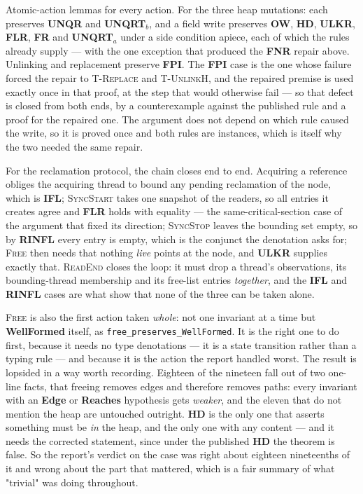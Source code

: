 Atomic-action lemmas for every action.  For the three heap mutations: each
preserves \textbf{UNQR} and \textbf{UNQRT}$_b$, and a field write preserves
\textbf{OW}, \textbf{HD}, \textbf{ULKR}, \textbf{FLR}, \textbf{FR} and
\textbf{UNQRT}$_a$ under a side condition apiece, each of which the rules
already supply --- with the one exception that produced the \textbf{FNR} repair
above.  Unlinking and replacement preserve \textbf{FPI}.  The \textbf{FPI} case
is the one whose failure forced the repair to \textsc{T-Replace} and
\textsc{T-UnlinkH}, and the
repaired premise is used exactly once in that proof, at the step that would otherwise
fail --- so that defect is closed from both ends, by a counterexample against the
published rule and a proof for the repaired one.  The argument does not depend on
which rule caused the write, so it is proved once and both rules are instances,
which is itself why the two needed the same repair.

For the reclamation protocol, the chain closes end to end.  Acquiring a
reference obliges the acquiring thread to bound any pending reclamation of the
node, which is \textbf{IFL}; \textsc{SyncStart} takes one snapshot of the
readers, so all entries it creates agree and \textbf{FLR} holds with equality
--- the same-critical-section case of the argument that fixed its direction;
\textsc{SyncStop} leaves the bounding set empty, so by \textbf{RINFL} every
entry is empty, which is the conjunct the \frbl{} denotation asks for;
\textsc{Free} then needs that nothing \emph{live} points at the node, and
\textbf{ULKR} supplies exactly that.  \textsc{ReadEnd} closes the loop: it must
drop a thread's observations, its bounding-thread membership and its free-list
entries \emph{together}, and the \textbf{IFL} and \textbf{RINFL} cases are
what show that none of the three can be taken alone.

\textsc{Free} is also the first action taken \emph{whole}: not one invariant at
a time but \textbf{WellFormed} itself, as \texttt{free\_preserves\_WellFormed}.
It is the right one to do first, because it needs no type denotations --- it is
a state transition rather than a typing rule --- and because it is the action
the report handled worst.  The result is lopsided in a way worth recording.
Eighteen of the nineteen fall out of two one-line facts, that freeing removes
edges and therefore removes paths: every invariant with an \textbf{Edge} or
\textbf{Reaches} hypothesis gets \emph{weaker}, and the eleven that do not
mention the heap are untouched outright.  \textbf{HD} is the only one that asserts
something must be \emph{in} the heap, and the only one with any content --- and it needs the
corrected statement, since under the published \textbf{HD} the theorem is false.
So the report's verdict on the case was right about eighteen nineteenths of it
and wrong about the part that mattered, which is a fair summary of what
"trivial" was doing throughout.


